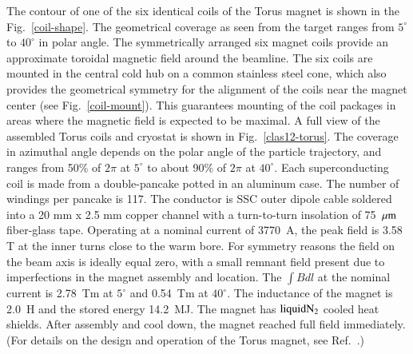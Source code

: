 \documentclass[final,3p,twocolumn]{elsarticle}
\begin{document}
The contour of one of the six identical coils of the Torus magnet is shown in the  Fig.~\ref{coil-shape}. The 
geometrical coverage as seen from the target ranges from
 $5^\circ$ to $40^\circ$ in polar angle. The symmetrically arranged six magnet coils provide an approximate toroidal magnetic field around the beamline. The six coils are mounted in the central cold hub on a common
stainless steel cone, which also provides the geometrical symmetry for the alignment of the coils near the magnet center (see Fig.~\ref{coil-mount}). 
This guarantees mounting of the coil packages in areas where the magnetic field is expected to be maximal. A full 
view of the assembled Torus coils and cryostat is shown in Fig.~\ref{clas12-torus}. The coverage in azimuthal angle depends on the polar angle of the particle 
 trajectory, and ranges from 50\% of $2\pi$ at $5^\circ$ to about 90\% of $2\pi$ at $40^\circ$. Each superconducting coil 
 is made from a double-pancake potted in an aluminum case. The number of windings per pancake is 117.
The conductor is SSC outer dipole cable soldered into a 20 mm x 2.5 mm copper channel with a turn-to-turn insolation 
of 75~$\mu \rm{m}$ fiber-glass tape. 
Operating at a nominal current of 3770~A, the peak field is 3.58 T at the inner turns close to the warm bore. 
For symmetry reasons the field on the beam axis is ideally equal zero, with a small remnant field present due to 
imperfections in the magnet assembly and location. The $\int {Bdl}$ at the nominal current is 2.78~Tm at $5^\circ$ and 0.54~Tm at $40^\circ$. The inductance of the magnet is 2.0~H and the stored energy 14.2~MJ. The magnet has $\rm liquid N_2$ cooled heat shields. After assembly and cool down, the magnet reached full field immediately.  (For details on the design and operation of the Torus magnet, see Ref.~\cite{clas12-magnets}.)
\end{document}
